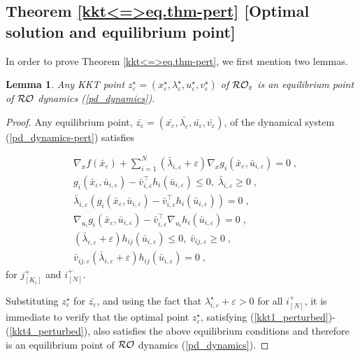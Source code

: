 \documentclass[journal,twoside,web]{ieeecolor}
\newtheorem{lemma}{Lemma}
\begin{document}
\subsection{Theorem \ref{kkt<=>eq.thm-pert} [Optimal solution and equilibrium point]}
In order to prove Theorem \ref{kkt<=>eq.thm-pert}, we first mention two lemmas. 

\begin{lemma}\label{kkttoeq.lem_perturbed}
Any KKT point $z_\varepsilon^\star=(x_\varepsilon^\star,\lambda_\varepsilon^\star,u_\varepsilon^\star,v_\varepsilon^\star)$ of ${\cal RO}_\varepsilon$ is an equilibrium point of ${\cal RO}$ dynamics (\ref{pd_dynamics}).
\end{lemma}
\begin{proof}
Any equilibrium point, $\bar{z_\varepsilon}=(\bar{x_\varepsilon},\bar{\lambda_\varepsilon},\bar{u_\varepsilon},\bar{v_\varepsilon})$, of the dynamical system (\ref{pd_dynamics-pert}) satisfies

\begin{align*}
&\nabla_x f(\bar x_\varepsilon)+\sum_{i=1}^N (\bar \lambda_{i,\varepsilon}+\varepsilon) \nabla_x g_i(\bar x_\varepsilon,\bar u_{i,\varepsilon})=0\;,\\
&g_{i}(\bar x_\varepsilon,\bar u_{i,\varepsilon})-\bar v_{i,\varepsilon}^\top h_i(\bar u_{i,\varepsilon})\leq 0,\;\bar \lambda_{i,\varepsilon}\geq 0\;,\\
&\bar \lambda_{i,\varepsilon}(g_{i}(\bar x_\varepsilon,\bar u_{i,\varepsilon})-\bar v_{i,\varepsilon}^\top h_i(\bar u_{i,\varepsilon}))=0\;,\\
&\nabla_{u_i} g_i(\bar x_\varepsilon,\bar u_{i,\varepsilon})-\bar v_{i,\varepsilon}^\top \nabla_{u_i} h_i(\bar u_{i,\varepsilon})=0\;,\\
&(\bar \lambda_{i,\varepsilon}+\varepsilon) h_{ij}(\bar u_{i,\varepsilon})\leq 0,\; \bar v_{ij,\varepsilon}\geq 0\;,\\
&\bar v_{ij,\varepsilon} (\bar \lambda_{i,\varepsilon}+\varepsilon) h_{ij}(\bar u_{i,\varepsilon})=0\;,
\end{align*}
for $j^+_{[K_i]}$ and $i^+_{[N]}$\;.

Substituting $z_\varepsilon^\star$ for $\bar{z_\varepsilon}$, and using the fact that $\lambda_{i,\varepsilon}^\star+\varepsilon>0$ for all $i^+_{[N]}$, it is immediate to verify that the optimal point $z_\varepsilon^\star$, satisfying (\ref{kkt1_perturbed})-(\ref{kkt4_perturbed}), also satisfies the above equilibrium conditions and therefore is an equilibrium point of ${\cal RO}$ dynamics (\ref{pd_dynamics}).
\end{proof}
\end{document}
